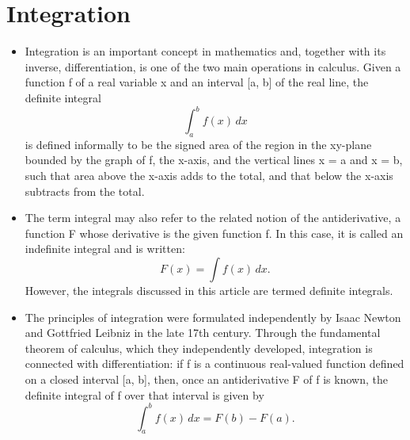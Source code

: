\documentclass[12pt]{article}
\begin{document}
\section{Integration}
\begin{itemize}
\item Integration is an important concept in mathematics and, together with its inverse, differentiation, is one of the two main operations in calculus. Given a function f of a real variable x and an interval [a, b] of the real line, the definite integral
\[\int_a^b \! f(x)\,dx\]
is defined informally to be the signed area of the region in the xy-plane bounded by the graph of f, the x-axis, and the vertical lines x = a and x = b, such that area above the x-axis adds to the total, and that below the x-axis subtracts from the total.
\item The term integral may also refer to the related notion of the antiderivative, a function F whose derivative is the given function f. In this case, it is called an indefinite integral and is written:
\[F(x) = \int f(x)\,dx.\]
However, the integrals discussed in this article are termed definite integrals.
\item The principles of integration were formulated independently by Isaac Newton and Gottfried Leibniz in the late 17th century. Through the fundamental theorem of calculus, which they independently developed, integration is connected with differentiation: if f is a continuous real-valued function defined on a closed interval [a, b], then, once an antiderivative F of f is known, the definite integral of f over that interval is given by
\[\int_a^b \! f(x)\,dx = F(b) - F(a).\]
\end{itemize}
\end{document}

